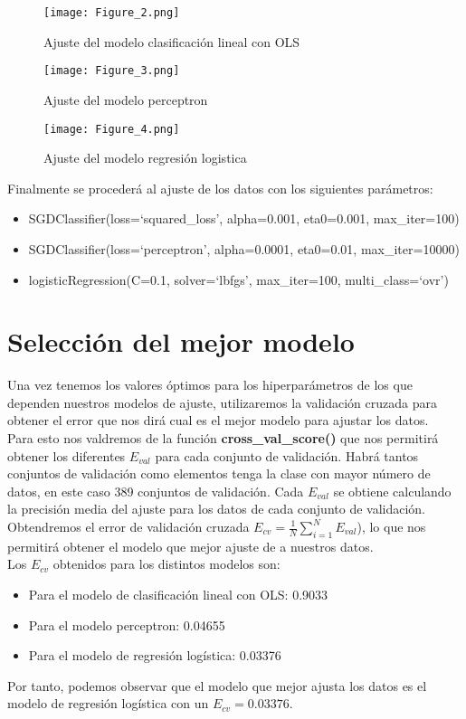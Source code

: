 \begin{figure}[H]
   \centering
   \texttt{[image: Figure\_2.png]}
   \caption{Ajuste del modelo clasificación lineal con OLS}
\end{figure}
\begin{figure}[H]
   \centering
   \texttt{[image: Figure\_3.png]}
   \caption{Ajuste del modelo perceptron}
\end{figure}
\begin{figure}[H]
   \centering
   \texttt{[image: Figure\_4.png]}
   \caption{Ajuste del modelo regresión logistica}
\end{figure}

Finalmente se procederá al ajuste de los datos con los siguientes parámetros:
\begin{itemize}
   \item SGDClassifier(loss=`squared\_loss', alpha=0.001, eta0=0.001, max\_iter=100)
   \item SGDClassifier(loss=`perceptron', alpha=0.0001, eta0=0.01, max\_iter=10000)
   \item logisticRegression(C=0.1, solver=`lbfgs', max\_iter=100, multi\_class=`ovr')
\end{itemize}

\section{Selección del mejor modelo}
Una vez tenemos los valores óptimos para los hiperparámetros de los que dependen nuestros modelos de ajuste, utilizaremos la validación cruzada para obtener el error que nos dirá cual es el mejor modelo para ajustar los datos.\\
Para esto nos valdremos de la función \textbf{cross\_val\_score()} \cite{Score} que nos permitirá obtener los diferentes $E_{val}$ para cada conjunto de validación. Habrá tantos conjuntos de validación como elementos tenga la clase con mayor número de datos, en este caso 389 conjuntos de validación. Cada $E_{val}$ se obtiene calculando la precisión media del ajuste para los datos de cada conjunto de validación. Obtendremos el error de validación cruzada $E_{cv} = \frac{1}{N}\sum_{i=1}^{N}E_{val}$), lo que nos permitirá obtener el modelo que mejor ajuste de a nuestros datos.\\
Los $E_{cv}$ obtenidos para los distintos modelos son:
\begin{itemize}
   \item Para el modelo de clasificación lineal con OLS: 0.9033
   \item Para el modelo perceptron: 0.04655
   \item Para el modelo de regresión logística: 0.03376
\end{itemize}
Por tanto, podemos observar que el modelo que mejor ajusta los datos es el modelo de regresión logística con un $E_{cv}=0.03376$.


